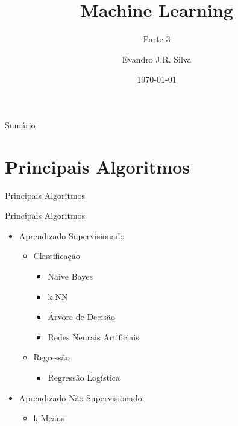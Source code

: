 \documentclass{libs/ufc_format}
\title[ML]{\huge\textbf{Machine Learning}}
\subtitle{Parte 3}
\author{Evandro J.R. Silva}
\institute[Estácio Teresina]{
    \normalsize{\email{ejrs.profissional@gmail.com}}
    \newline
    \department{Bacharelado em Ciência da Computação}
    \newline
    \estaciothe
}
\date{\today}
\begin{document}


\begin{frame}{}
    \maketitle
\end{frame}

\begin{frame}{Sumário}
    \begin{multicols}{2}
        \tableofcontents
    \end{multicols}
\end{frame}

\section{Principais Algoritmos}

\begin{frame}{}
    \centering
    \LARGE
    Principais Algoritmos
\end{frame}

\begin{frame}{Principais Algoritmos}
    \begin{itemize}
        \item Aprendizado Supervisionado
            \begin{itemize}
                \item Classificação
                    \begin{itemize}
                        \item Naive Bayes
                        \item k-NN
                        \item Árvore de Decisão
                        \item \alert{Redes Neurais Artificiais}
                    \end{itemize}
                \item Regressão
                    \begin{itemize}
                        \item Regressão Logística
                    \end{itemize}
            \end{itemize}
        \item Aprendizado Não Supervisionado
            \begin{itemize}
                \item k-Means
            \end{itemize}
    \end{itemize}
\end{frame}
\end{document}
